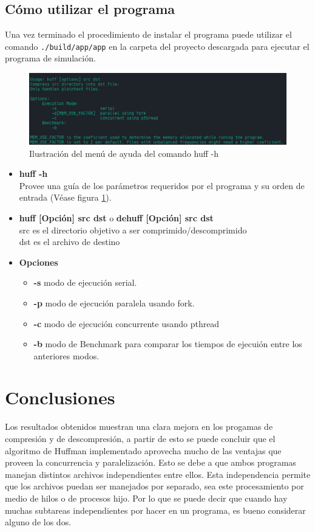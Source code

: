 \documentclass{report}
\begin{document}
\subsection{Cómo utilizar el programa}
Una vez terminado el procedimiento de instalar el programa puede utilizar el comando \texttt{./build/app/app} en la carpeta del proyecto descargada para ejecutar el programa de simulación.

\begin{figure}[h]
    \centering
    \includegraphics[width=0.8\linewidth]{figuras/huff_ayuda.png}
    \caption{Ilustración del menú de ayuda del comando huff -h}
    \label{fig:huffayuda}
\end{figure}

\begin{itemize}
  \item \textbf{huff -h}\\ \hspace{2cm}
    Provee una guía de los parámetros requeridos por el programa y su orden de entrada (Véase figura \ref{fig:huffayuda}).
  \item \textbf{huff [Opción] src dst} o \textbf{dehuff [Opción] src dst}\\
src es el directorio objetivo a ser comprimido/descomprimido\\
dst es el archivo de destino
  \item \textbf{Opciones} 
    \begin{itemize}
      \item \textbf{-s} modo de ejecución serial.
      \item \textbf{-p} modo de ejecución paralela usando fork.
      \item \textbf{-c} modo de ejecución concurrente usando pthread
      \item \textbf{-b} modo de Benchmark para comparar los tiempos de ejecuión entre los anteriores modos.
    \end{itemize}
\end{itemize}


\section{Conclusiones}
Los resultados obtenidos muestran una clara mejora en los progamas de compresión y de descompresión, a partir de esto se puede concluir que el algoritmo de Huffman implementado aprovecha mucho de las ventajas que proveen la concurrencia y paralelización. 
Esto se debe a que ambos programas manejan distintos archivos independientes entre ellos.
Esta independencia permite que los archivos puedan ser manejados por separado, sea este procesamiento por medio de hilos o de procesos hijo.
Por lo que se puede decir que cuando hay muchas subtareas independientes por hacer en un programa, es bueno considerar alguno de los dos. 
\end{document}
